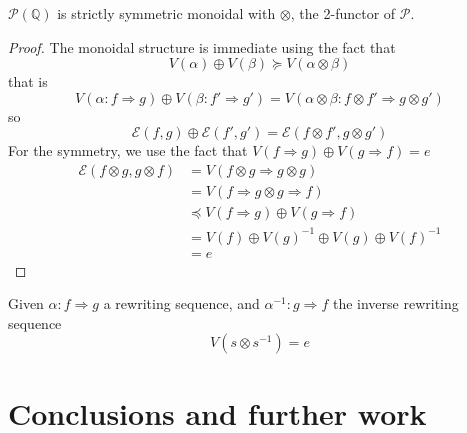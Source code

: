 \documentclass[a4paper]{article}
\begin{document}
\begin{proposition}
  $\mathcal{P}(\mathbb{Q})$ is strictly symmetric monoidal with $\otimes$, the
    2-functor of $\mathcal{P}$.
  
  \begin{proof}
    The monoidal structure is immediate using the fact that
    \[
      V(\alpha) \oplus V(\beta) \succeq V(\alpha \otimes \beta)
    \]
    that is
    \[
      V(\alpha: f \Rightarrow g) \oplus V(\beta: f' \Rightarrow g') = V(\alpha
        \otimes \beta: f \otimes f' \Rightarrow g \otimes g')
    \]
    so
    \[
      \mathcal{E}(f, g) \oplus \mathcal{E}(f', g') = \mathcal{E}(f \otimes f', g
        \otimes g')
    \]
    For the symmetry, we use the fact that $V(f \Rightarrow g) \oplus V(g
      \Rightarrow f) = e$
    \begin{align}
      \mathcal{E}(f \otimes g, g \otimes f) &= V(f \otimes g \Rightarrow g
        \otimes g) \\
      &= V(f \Rightarrow g \otimes g \Rightarrow f) \\
      &\preceq V(f \Rightarrow g) \oplus V(g \Rightarrow f) \\
      &= V(f) \oplus V(g)^{-1} \oplus V(g) \oplus V(f)^{-1} \\
      &= e
    \end{align}
  \end{proof}
\end{proposition}

\begin{corollary}
  Given $\alpha: f \Rightarrow g$ a rewriting sequence, and $\alpha^{-1}: g
    \Rightarrow f$ the inverse rewriting sequence
  \[
    V(s \otimes s^{-1}) = e
  \]
\end{corollary}


\section{Conclusions and further work}
\label{sec:conclusion}



\small

\end{document}
